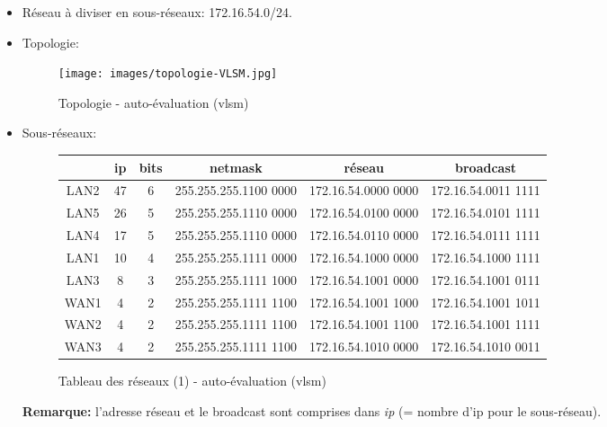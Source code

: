 \documentclass[a4paper]{article}
\begin{document}
\begin{itemize}





\item Réseau à diviser en sous-réseaux: 172.16.54.0/24.





\item Topologie:
\begin{figure}[H]
    \centering
    \texttt{[image: images/topologie-VLSM.jpg]}    
    \caption{Topologie - auto-évaluation (vlsm)}
    \label{}
\end{figure}





\item Sous-réseaux:
\begin{figure}[H]
    \centering
    \begin{tabular}{|c|c|c|c|c|c|} \hline
        &      ip      & bits    & netmask             & réseau              & broadcast           \\ \hline
        LAN2 & 47      & 6       & 255.255.255.1100 0000 & 172.16.54.0000 0000 & 172.16.54.0011 1111 \\
        LAN5 & 26      & 5       & 255.255.255.1110 0000 & 172.16.54.0100 0000 & 172.16.54.0101 1111 \\
        LAN4 & 17      & 5       & 255.255.255.1110 0000 & 172.16.54.0110 0000 & 172.16.54.0111 1111 \\
        LAN1 & 10      & 4       & 255.255.255.1111 0000 & 172.16.54.1000 0000 & 172.16.54.1000 1111 \\
        LAN3 &  8      & 3       & 255.255.255.1111 1000 & 172.16.54.1001 0000 & 172.16.54.1001 0111 \\
        WAN1 &  4      & 2       & 255.255.255.1111 1100 & 172.16.54.1001 1000 & 172.16.54.1001 1011 \\
        WAN2 &  4      & 2       & 255.255.255.1111 1100 & 172.16.54.1001 1100 & 172.16.54.1001 1111 \\
        WAN3 &  4      & 2       & 255.255.255.1111 1100 & 172.16.54.1010 0000 & 172.16.54.1010 0011 \\ \hline
    \end{tabular}
    \caption{Tableau des réseaux (1) - auto-évaluation (vlsm)}
    \label{}
\end{figure}
\textbf{Remarque:} l'adresse réseau et le broadcast sont comprises dans \textit{ip} (= nombre d'ip pour le sous-réseau). \\

\end{itemize}
\end{document}
